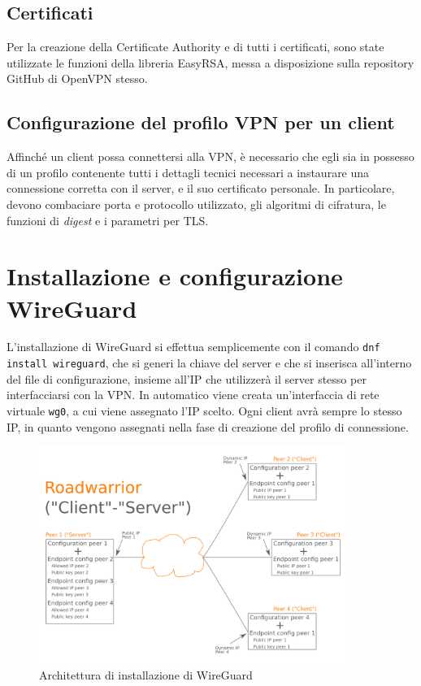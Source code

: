\subsection{Certificati}
Per la creazione della Certificate Authority e di tutti i certificati, sono state utilizzate le funzioni della libreria EasyRSA, messa a disposizione sulla repository GitHub di OpenVPN stesso.

\subsection{Configurazione del profilo VPN per un client}
Affinché un client possa connettersi alla VPN, è necessario che egli sia in possesso di un profilo contenente tutti i dettagli tecnici necessari a instaurare una connessione corretta con il server, e il suo certificato personale. In particolare, devono combaciare porta e protocollo utilizzato, gli algoritmi di cifratura, le funzioni di \emph{digest} e i parametri per TLS.

\section{Installazione e configurazione WireGuard}
L'installazione di WireGuard si effettua semplicemente con il comando \texttt{dnf install wireguard}, che si generi la chiave del server e che si inserisca all'interno del file di configurazione, insieme all'IP che utilizzerà il server stesso per interfacciarsi con la VPN. In automatico viene creata un'interfaccia di rete virtuale \texttt{wg0}, a cui viene assegnato l'IP scelto.
Ogni client avrà sempre lo stesso IP, in quanto vengono assegnati nella fase di creazione del profilo di connessione.

\begin{figure}[ht]
    \centering
    \includegraphics[width=10cm]{figure/Wireguard-roadwarrior.png}
    \caption{Architettura di installazione di WireGuard}
\end{figure}


